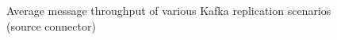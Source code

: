 \begin{figure}[htbp]
{    }
    \hfill
    \centering
    \hfill
    \caption{Average message throughput of various Kafka replication scenarios (source connector)}
    \label{fig:appendix02:results:sourcemessages}
\end{figure}
